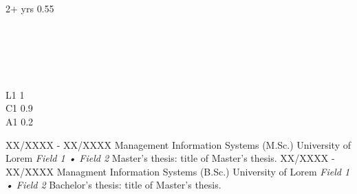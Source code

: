  \\[-1pt]

 \\[-1pt]

 \\[-1pt]

 {2+ yrs} {0.55} \\[-1pt]

 \\[-1pt]

 \\[-1pt]




 \\[-1pt]

 \\[-1pt]


{}

 {L1} {1} \\[-1pt]

 {C1} {0.9} \\[-1pt]

 {A1} {0.2} \\[-1pt]


\cvmetaevent
{XX/XXXX - XX/XXXX}
{Management Information Systems (M.Sc.)}
{University of Lorem}
{\textit{Field 1 • Field 2} \newline Master's thesis: \glqq title of Master's thesis\grqq.}
\cvmetaevent
{XX/XXXX - XX/XXXX}
{Managment Information Systems (B.Sc.)}
{University of Lorem}
{\textit{Field 1 • Field 2} \newline Bachelor's thesis: \glqq title of Master's thesis\grqq.}

